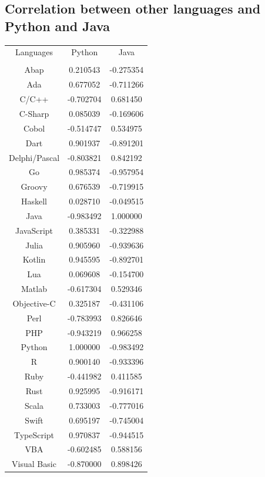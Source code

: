 \documentclass[conference]{IEEEtran}
\begin{document}
\subsection{Correlation between other languages and Python and Java}
\begin{center}
\begin{tabular}{ c c c }
Languages & Python & Java\\\\
Abap & 0.210543 & -0.275354\\
Ada & 0.677052 & -0.711266\\
C/C++ & -0.702704 & 0.681450\\
C-Sharp & 0.085039 & -0.169606\\
Cobol & -0.514747 & 0.534975\\
Dart & 0.901937 & -0.891201\\
Delphi/Pascal & -0.803821 & 0.842192\\
Go & 0.985374 & -0.957954\\
Groovy & 0.676539 & -0.719915\\
Haskell & 0.028710 & -0.049515\\
Java & -0.983492 & 1.000000\\
JavaScript & 0.385331 & -0.322988\\
Julia & 0.905960 & -0.939636\\
Kotlin & 0.945595 & -0.892701\\
Lua & 0.069608 & -0.154700\\
Matlab & -0.617304 & 0.529346\\
Objective-C & 0.325187 & -0.431106\\
Perl & -0.783993 & 0.826646\\
PHP & -0.943219 & 0.966258\\
Python & 1.000000 & -0.983492\\
R & 0.900140 & -0.933396\\
Ruby & -0.441982 & 0.411585\\
Rust & 0.925995 & -0.916171\\
Scala & 0.733003 & -0.777016\\
Swift & 0.695197 & -0.745004\\
TypeScript & 0.970837 & -0.944515\\
VBA & -0.602485 & 0.588156\\
Visual Basic & -0.870000 & 0.898426\\

\end{tabular}
\end{center}
\end{document}
